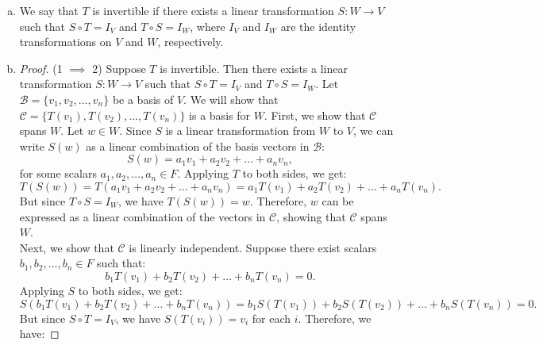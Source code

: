 \documentclass{article}
\begin{document}


\begin{enumerate}[(a)]
    \item We say that $T$ is invertible if there exists a linear transformation $S: W \to V$ such that $S \circ T = I_V$ and $T \circ S = I_W$, where $I_V$ and $I_W$ are the identity transformations on $V$ and $W$, respectively.
    \item \begin{proof}
        (1 $\implies$ 2) Suppose $T$ is invertible. Then there exists a linear transformation $S: W \to V$ such that $S \circ T = I_V$ and $T \circ S = I_W$. Let $\mathscr{B} = \{ v_1, v_2, \ldots, v_n \}$ be a basis of $V$. We will show that $\mathscr{C} = \{ T(v_1), T(v_2), \ldots, T(v_n) \}$ is a basis for $W$. %
        First, we show that $\mathscr{C}$ spans $W$. Let $w \in W$. Since $S$ is a linear transformation from $W$ to $V$, we can write $S(w)$ as a linear combination of the basis vectors in $\mathscr{B}$:
        \begin{equation*}
            S(w) = a_1 v_1 + a_2 v_2 + \ldots + a_n v_n,
        \end{equation*}
        for some scalars $a_1, a_2, \ldots, a_n \in F$. Applying $T$ to both sides, we get:
        \begin{equation*}
            T(S(w)) = T(a_1 v_1 + a_2 v_2 + \ldots + a_n v_n) = a_1 T(v_1) + a_2 T(v_2) + \ldots + a_n T(v_n).
        \end{equation*}
        But since $T \circ S = I_W$, we have $T(S(w)) = w$. Therefore, $w$ can be expressed as a linear combination of the vectors in $\mathscr{C}$, showing that $\mathscr{C}$ spans $W$. \\
        Next, we show that $\mathscr{C}$ is linearly independent. Suppose there exist scalars $b_1, b_2, \ldots, b_n \in F$ such that:
        \begin{equation*}
            b_1 T(v_1) + b_2 T(v_2) + \ldots + b_n T(v_n) = 0.
        \end{equation*}
        Applying $S$ to both sides, we get:
        \begin{equation*}
            S(b_1 T(v_1) + b_2 T(v_2) + \ldots + b_n T(v_n)) = b_1 S(T(v_1)) + b_2 S(T(v_2)) + \ldots + b_n S(T(v_n)) = 0.
        \end{equation*}
        But since $S \circ T = I_V$, we have $S(T(v_i)) = v_i$ for each $i$. Therefore, we have:

\end{proof}
\end{enumerate}
\end{document}
